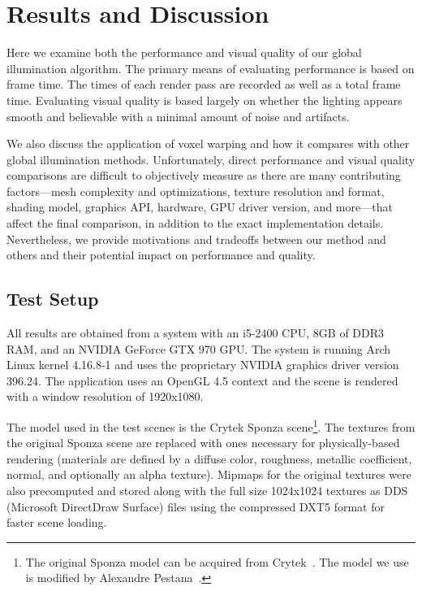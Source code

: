 \chapter{Results and Discussion}

Here we examine both the performance and visual quality of our global illumination algorithm. The primary means of evaluating performance is based on frame time. The times of each render pass are recorded as well as a total frame time. Evaluating visual quality is based largely on whether the lighting appears smooth and believable with a minimal amount of noise and artifacts.

We also discuss the application of voxel warping and how it compares with other global illumination methods. Unfortunately, direct performance and visual quality comparisons are difficult to objectively measure as there are many contributing factors---mesh complexity and optimizations, texture resolution and format, shading model, graphics API, hardware, GPU driver version, and more---that affect the final comparison, in addition to the exact implementation details. Nevertheless, we provide motivations and tradeoffs between our method and others and their potential impact on performance and quality.

\section{Test Setup}
All results are obtained from a system with an i5-2400 CPU, 8GB of DDR3 RAM, and an NVIDIA GeForce GTX 970 GPU. The system is running Arch Linux kernel 4.16.8-1 and uses the proprietary NVIDIA graphics driver version 396.24. The application uses an OpenGL 4.5 context and the scene is rendered with a window resolution of 1920x1080.

The model used in the test scenes is the Crytek Sponza scene\footnote{The original Sponza model can be acquired from Crytek~\cite{sponza_og}. The model we use is modified by Alexandre Pestana~\cite{sponza_pbr}.}. The textures from the original Sponza scene are replaced with ones necessary for physically-based rendering (materials are defined by a diffuse color, roughness, metallic coefficient, normal, and optionally an alpha texture). Mipmaps for the original textures were also precomputed and stored along with the full size 1024x1024 textures as DDS (Microsoft DirectDraw Surface) files using the compressed DXT5 format for faster scene loading.

